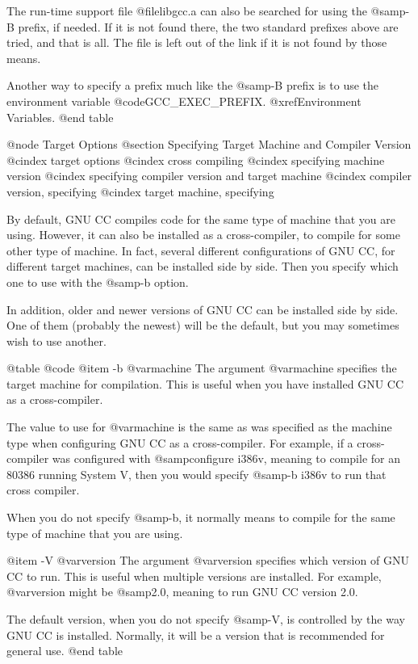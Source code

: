 {{The run-time support file @file{libgcc.a} can also be searched for using
the @samp{-B} prefix, if needed.  If it is not found there, the two
standard prefixes above are tried, and that is all.  The file is left
out of the link if it is not found by those means.

Another way to specify a prefix much like the @samp{-B} prefix is to use
the environment variable @code{GCC_EXEC_PREFIX}.  @xref{Environment
Variables}.
@end table

@node Target Options
@section Specifying Target Machine and Compiler Version
@cindex target options
@cindex cross compiling
@cindex specifying machine version
@cindex specifying compiler version and target machine
@cindex compiler version, specifying
@cindex target machine, specifying

By default, GNU CC compiles code for the same type of machine that you
are using.  However, it can also be installed as a cross-compiler, to
compile for some other type of machine.  In fact, several different
configurations of GNU CC, for different target machines, can be
installed side by side.  Then you specify which one to use with the
@samp{-b} option.

In addition, older and newer versions of GNU CC can be installed side
by side.  One of them (probably the newest) will be the default, but
you may sometimes wish to use another.

@table @code
@item -b @var{machine}
The argument @var{machine} specifies the target machine for compilation.
This is useful when you have installed GNU CC as a cross-compiler.

The value to use for @var{machine} is the same as was specified as the
machine type when configuring GNU CC as a cross-compiler.  For
example, if a cross-compiler was configured with @samp{configure
i386v}, meaning to compile for an 80386 running System V, then you
would specify @samp{-b i386v} to run that cross compiler.

When you do not specify @samp{-b}, it normally means to compile for
the same type of machine that you are using.

@item -V @var{version}
The argument @var{version} specifies which version of GNU CC to run.
This is useful when multiple versions are installed.  For example,
@var{version} might be @samp{2.0}, meaning to run GNU CC version 2.0.

The default version, when you do not specify @samp{-V}, is controlled
by the way GNU CC is installed.  Normally, it will be a version that
is recommended for general use.
@end table

}}
